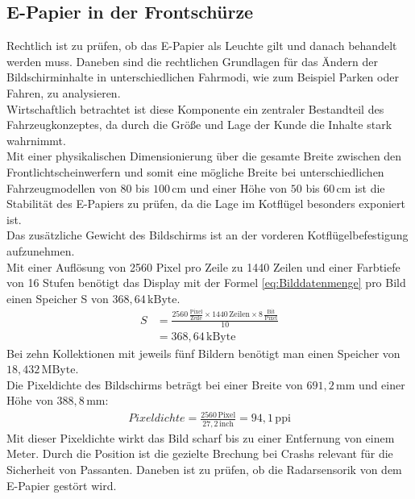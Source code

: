 \subsection{E-Papier in der Frontschürze}
Rechtlich ist zu prüfen, ob das E-Papier als Leuchte gilt und danach behandelt werden muss. Daneben sind die rechtlichen Grundlagen für das Ändern der Bildschirminhalte in unterschiedlichen Fahrmodi, wie zum Beispiel Parken oder Fahren, zu analysieren. \\
Wirtschaftlich betrachtet ist diese Komponente ein zentraler Bestandteil des Fahrzeugkonzeptes, da durch die Größe und Lage der Kunde die Inhalte stark wahrnimmt. \\
Mit einer physikalischen Dimensionierung über die gesamte Breite zwischen den Frontlichtscheinwerfern und somit eine mögliche Breite bei unterschiedlichen Fahrzeugmodellen von $ 80 $ bis $ 100\,\mathrm{cm} $ und einer Höhe von $ 50 $ bis $ 60\,\mathrm{cm} $ ist die Stabilität des E-Papiers zu prüfen, da die Lage im Kotflügel besonders exponiert ist. \\ 
Das zusätzliche Gewicht des Bildschirms ist an der vorderen Kotflügelbefestigung aufzunehmen. \\
Mit einer Auflösung von 2560 Pixel pro Zeile zu 1440 Zeilen und einer Farbtiefe von 16 Stufen benötigt das Display mit der Formel \ref{eq:Bilddatenmenge} pro Bild einen Speicher S von $ 368,64\,\mathrm{kByte} $. 
\begin{align}
	S &= \frac{2560\,\frac{\mathrm{Pixel}}{\mathrm{Zeile}}\times 1440\,\mathrm{Zeilen} \times 8\,\frac{\mathrm{Bit}}{\mathrm{Pixel}}}{10} \\
	&=  368,64\,\mathrm{kByte}
\end{align}
Bei zehn Kollektionen mit jeweils fünf Bildern benötigt man einen Speicher von $ 18,432\,\mathrm{MByte} $. \\
Die Pixeldichte des Bildschirms beträgt bei einer Breite von $ 691,2\,\mathrm{mm} $ und einer Höhe von $ 388,8\,\mathrm{mm} $:
\begin{align}
	Pixeldichte = \frac{2560\,\mathrm{Pixel}}{27,2\,\mathrm{inch}} = 94,1\,\mathrm{ppi}
\end{align}
Mit dieser Pixeldichte wirkt das Bild scharf bis zu einer Entfernung von einem Meter.
Durch die Position ist die gezielte Brechung bei Crashs relevant für die Sicherheit von Passanten.
Daneben ist zu prüfen, ob die Radarsensorik von dem E-Papier gestört wird.\\

